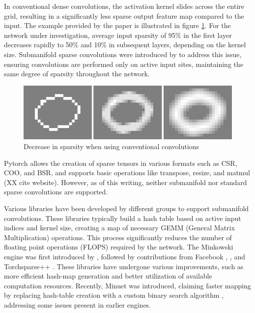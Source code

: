\documentclass{article}
\begin{document}
In conventional dense convolutions, the activation kernel slides across the entire grid, resulting in a significantly less sparse output feature map compared to the input. The example provided by the paper is illustrated in figure \ref{decrease-sparsity}. For the network under investigation, average input sparsity of 95\% in the first layer decreases rapidly to 50\% and 10\% in subsequent layers, depending on the kernel size. Submanifold sparse convolutions were introduced by \cite{SubmanifoldSparseConvNet} to address this issue, ensuring convolutions are performed only on active input sites, maintaining the same degree of sparsity throughout the network.

\begin{figure}[h!]
    \centering
    \includegraphics[width=0.9\linewidth]{figures/Sparse.png}
    \caption{Decrease in sparsity when using conventional convolutions \cite{SubmanifoldSparseConvNet}}
    \label{decrease-sparsity}
\end{figure}

Pytorch allows the creation of sparse tensors in various formats such as CSR, COO, and BSR, and supports basic operations like transpose, resize, and matmul (XX cite website). However, as of this writing, neither submanifold nor standard sparse convolutions are supported.

Various libraries have been developed by different groups to support submanifold convolutions. These libraries typically build a hash table based on active input indices and kernel size, creating a map of necessary GEMM (General Matrix Multiplication) operations. This process significantly reduces the number of floating point operations (FLOPS) required by the network. The Minkowski engine was first introduced by \cite{choy20194d-MinkowskiEngine}, followed by contributions from Facebook \cite{SubmanifoldSparseConvNet}, \cite{focalsconv-chen-SPconvPlus}, and Torchsparse++ \cite{tang2023torchsparse++}. These libraries have undergone various improvements, such as more efficient hash-map generation and better utilization of available computation resources. Recently, Minuet was introduced, claiming faster mapping by replacing hash-table creation with a custom binary search algorithm \cite{yang2023minuet}, addressing some issues present in earlier engines.
\end{document}
